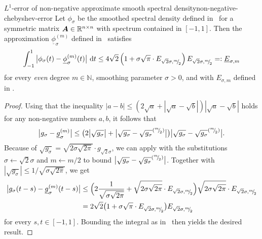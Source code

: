 \begin{lemma}{$L^1$-error of non-negative approximate smooth spectral density}{non-negative-chebyshev-error}
Let $\phi_{\sigma}$ be the smoothed spectral density defined in~
for a symmetric matrix $\boldsymbol{A} \in \mathbb{R}^{n \times n}$ with spectrum contained in $[-1, 1]$. Then the approximation $\underline{\phi}_{\sigma}^{(m)}$ defined in~ satisfies
    \begin{equation*}
        \int_{-1}^{1} \big| \phi_{\sigma}(t) - \underline{\phi}_{\sigma}^{(m)}(t) \big|~\mathrm{d}t \leq 4 \sqrt{2} \left(1 + \sigma \sqrt{\pi} \cdot E_{\sqrt{2}\sigma, {}^{m}{\mskip -5mu/\mskip -3mu}_{2}}\right) E_{\sqrt{2}\sigma, {}^{m}{\mskip -5mu/\mskip -3mu}_{2}} =: \underline{E}_{\sigma, m}
        \label{equ:chebyshev-interpolation-sup-error-kernel-nonneg}
    \end{equation*}
    for every \emph{even} degree $m \in \mathbb{N}$, smoothing parameter $\sigma > 0$, and with $E_{\sigma, m}$ defined in .
\end{lemma}
\begin{proof}
    Using that the inequality $| a - b | \leq (2 \sqrt{a} + | \sqrt{a} - \sqrt{b} |)  | \sqrt{a} - \sqrt{b} |$ holds for any non-negative numbers $a, b$, it follows that
    \begin{equation*}
        \big| g_{\sigma} - \underline{g}_{\sigma}^{(m)} \big| \leq \big( 2 \big| \sqrt{g_{\sigma}} \big| + \big| \sqrt{g_{\sigma}} - \sqrt{g_{\sigma}}^{({}^{m}{\mskip -5mu/\mskip -3mu}_{2})} \big| \big) \big| \sqrt{g_{\sigma}} - \sqrt{g_{\sigma}}^{({}^{m}{\mskip -5mu/\mskip -3mu}_{2})} \big|.
    \end{equation*}
    Because of $\sqrt{g_{\sigma}} = \sqrt{2 \sigma \sqrt{2 \pi}} \cdot g_{\sqrt{2}\sigma}$,
we can apply  with the substitutions
    $\sigma \gets \sqrt{2}\sigma$ and $m \gets m/2$ to bound 
    $\big| \sqrt{g_{\sigma}} - \sqrt{g_{\sigma}}^{({}^{m}{\mskip -5mu/\mskip -3mu}_{2})} \big|$.
    Together with  $|\sqrt{g_{\sigma}}| \leq 1/\sqrt{\sigma \sqrt{2 \pi}}$, we get
    \begin{align*}
        \big| g_{\sigma}(t - s) - \underline{g}_{\sigma}^{(m)}(t - s) \big| \notag 
        &\leq \Big( 2 \frac{1}{\sqrt{ \sigma \sqrt{2\pi}}} + \sqrt{2 \sigma \sqrt{2 \pi}} \cdot E_{\sqrt{2}\sigma, {}^{m}{\mskip -5mu/\mskip -3mu}_{2}}\Big)\sqrt{2 \sigma \sqrt{2 \pi}} \cdot E_{\sqrt{2}\sigma, {}^{m}{\mskip -5mu/\mskip -3mu}_{2}} \notag \\
        &= 2\sqrt{2} \big(1 + \sigma \sqrt{\pi} \cdot E_{\sqrt{2}\sigma, {}^{m}{\mskip -5mu/\mskip -3mu}_{2}}\big) E_{\sqrt{2}\sigma, {}^{m}{\mskip -5mu/\mskip -3mu}_{2}}
    \end{align*}
    for every $s,t \in [-1, 1]$.
    Bounding the integral as in~ then yields the desired result.
\end{proof}

